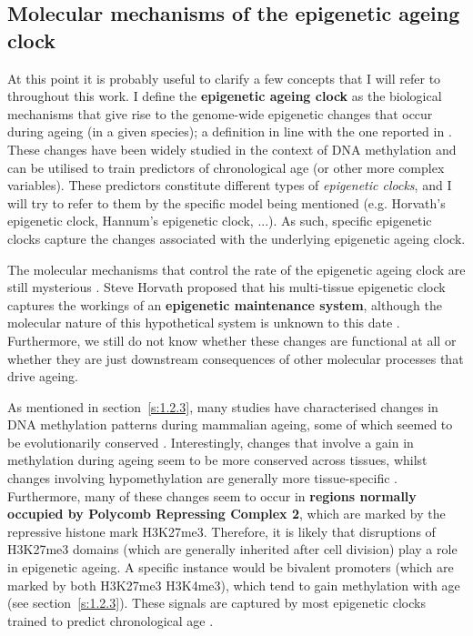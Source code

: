\smallskip

\subsection{Molecular mechanisms of the epigenetic ageing clock} \label{s:1.3.3}

\smallskip

At this point it is probably useful to clarify a few concepts that I will refer to throughout this work. I define the \textbf{epigenetic ageing clock} as the biological mechanisms that give rise to the genome-wide epigenetic changes that occur during ageing (in a given species); a definition in line with the one reported in \cite{Horvath2018}. These changes have been widely studied in the context of DNA methylation and can be utilised to train predictors of chronological age (or other more complex variables). These predictors constitute different types of \textit{epigenetic clocks}, and I will try to refer to them by the specific model being mentioned (e.g. Horvath's epigenetic clock, Hannum's epigenetic clock, ...). As such, specific epigenetic clocks capture the changes associated with the underlying epigenetic ageing clock.

\bigskip

The molecular mechanisms that control the rate of the epigenetic ageing clock are still mysterious \cite{Horvath2018,Field2018}. Steve Horvath proposed that his multi-tissue epigenetic clock captures the workings of an \textbf{epigenetic maintenance system}, although the molecular nature of this hypothetical system is unknown to this date \cite{Horvath2013}. Furthermore, we still do not know whether these changes are functional at all or whether they are just downstream consequences of other molecular processes that drive ageing. 

\bigskip

As mentioned in section~\ref{s:1.2.3}, many studies have characterised changes in DNA methylation patterns during mammalian ageing, some of which seemed to be evolutionarily conserved \cite{Horvath2013,Lowe2018}. Interestingly, changes that involve a gain in methylation during ageing seem to be more conserved across tissues, whilst changes involving hypomethylation are generally more tissue-specific \cite{Horvath2013,Yang2016}. Furthermore, many of these changes seem to occur in \textbf{regions normally occupied by Polycomb Repressing Complex 2}, which are marked by the repressive histone mark H3K27me3. Therefore, it is likely that disruptions of H3K27me3 domains (which are generally inherited after cell division) play a role in epigenetic ageing. A specific instance would be bivalent promoters (which are marked by both H3K27me3 H3K4me3), which tend to gain methylation with age (see section~\ref{s:1.2.3}). These signals are captured by most epigenetic clocks trained to predict chronological age \cite{Horvath2018}.

